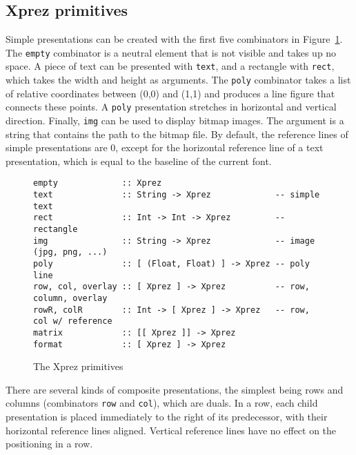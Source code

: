 %																
\subsection{{\sc Xprez} primitives} \label{sect:primitives}

Simple presentations can be created with the first five combinators in Figure~\ref{xprezprim}. The \texttt{empty} combinator is a neutral element that is not visible and takes up no space. A piece of text can be presented with \texttt{text}, and a rectangle with \texttt{rect}, which takes the width and height as arguments. The \texttt{poly} combinator takes a list of relative coordinates between (0,0) and (1,1) and produces a line figure that connects these points. A \texttt{poly} presentation stretches in horizontal and vertical direction. Finally, \texttt{img} can be used to display bitmap images. The argument is a string that contains the path to the bitmap file. By default, the reference lines of simple presentations are 0, except for the horizontal reference line of a text presentation, which is equal to the baseline of the current font.

\begin{figure}
\begin{small}
\begin{center}
\begin{small}
\begin{verbatim}
empty             :: Xprez
text              :: String -> Xprez             -- simple text
rect              :: Int -> Int -> Xprez         -- rectangle
img               :: String -> Xprez             -- image (jpg, png, ...)
poly              :: [ (Float, Float) ] -> Xprez -- poly line
row, col, overlay :: [ Xprez ] -> Xprez          -- row, column, overlay
rowR, colR        :: Int -> [ Xprez ] -> Xprez   -- row, col w/ reference
matrix            :: [[ Xprez ]] -> Xprez
format            :: [ Xprez ] -> Xprez
\end{verbatim}
\end{small}
\caption{The {\sc Xprez} primitives} \label{xprezprim} 
\end{center}
\end{small}
\end{figure}

There are several kinds of composite presentations, the simplest being rows and columns (combinators \texttt{row} and \texttt{col}), which are duals. In a row, each child presentation is placed immediately to the right of its predecessor, with their horizontal reference lines aligned. Vertical reference lines have no effect on the positioning in a row.

